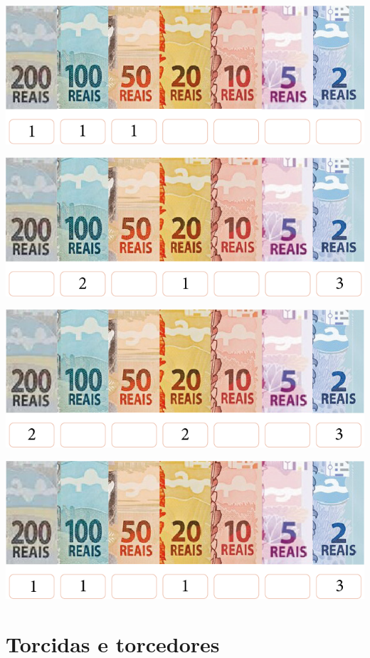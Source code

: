 \begin{escolha}[itemsep=-5pt]
\item \includegraphics[width=.7\textwidth]{./media/image80.png}

\item \includegraphics[width=.7\textwidth]{./media/image81.png}

\item \includegraphics[width=.7\textwidth]{./media/image82.png}

\item \includegraphics[width=.7\textwidth]{./media/image83.png}
\end{escolha}


\chapter{Torcidas e torcedores}



